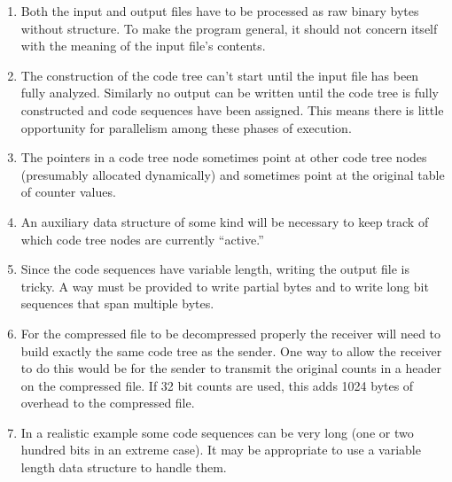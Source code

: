 \begin{enumerate}

\item Both the input and output files have to be processed as raw binary bytes without
  structure. To make the program general, it should not concern itself with the meaning of the
  input file's contents.

\item The construction of the code tree can't start until the input file has been fully
  analyzed. Similarly no output can be written until the code tree is fully constructed and code
  sequences have been assigned. This means there is little opportunity for parallelism among
  these phases of execution.

\item The pointers in a code tree node sometimes point at other code tree nodes (presumably
  allocated dynamically) and sometimes point at the original table of counter values.

\item An auxiliary data structure of some kind will be necessary to keep track of which code
  tree nodes are currently ``active.''

\item Since the code sequences have variable length, writing the output file is tricky. A way
  must be provided to write partial bytes and to write long bit sequences that span multiple
  bytes.

\item For the compressed file to be decompressed properly the receiver will need to build
  exactly the same code tree as the sender. One way to allow the receiver to do this would be
  for the sender to transmit the original counts in a header on the compressed file. If 32 bit
  counts are used, this adds 1024 bytes of overhead to the compressed file.

\item In a realistic example some code sequences can be very long (one or two hundred bits in an
  extreme case). It may be appropriate to use a variable length data structure to handle them.

\end{enumerate}

